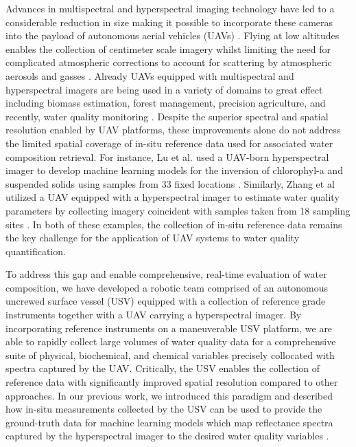 \documentclass[remotesensing,article,submit,pdftex,moreauthors]{Definitions/mdpi}
\begin{document}
Advances in multispectral and hyperspectral imaging technology have led to a considerable reduction in size making it possible to incorporate these cameras into the payload of autonomous aerial vehicles (UAVs) \cite{hruska2012radiometric}. Flying at low altitudes enables the collection of centimeter scale imagery whilst limiting the need for complicated atmospheric corrections to account for scattering by atmospheric aerosols and gasses \cite{adao2017hyperspectral, banerjee2020uav}. Already UAVs equipped with multispectral and hyperspectral imagers are being used in a variety of domains to great effect including biomass estimation, forest management, precision agriculture, and recently, water quality monitoring \cite{adao2017hyperspectral, padua2017uas,arroyo2019implementation,kurihara2020unmanned, ehmann2019monitoring}. Despite the superior spectral and spatial resolution enabled by UAV platforms, these improvements alone do not address the limited spatial coverage of in-situ reference data used for associated water composition retrieval. For instance, Lu et al. used a UAV-born hyperspectral imager to develop machine learning models for the inversion of chlorophyl-a and suspended solids using samples from 33 fixed locations \cite{lu2021retrieval}. Similarly, Zhang et al utilized a UAV equipped with a hyperspectral imager to estimate water quality parameters by collecting imagery coincident with samples taken from 18 sampling sites \cite{zhang2022selection}. In both of these examples, the collection of in-situ reference data remains the key challenge for the application of UAV systems to water quality quantification.

To address this gap and enable comprehensive, real-time evaluation of water composition, we have developed a robotic team comprised of an autonomous uncrewed surface vessel (USV) equipped with a collection of reference grade instruments together with a UAV carrying a hyperspectral imager. By incorporating reference instruments on a maneuverable USV platform, we are able to rapidly collect large volumes of water quality data for a comprehensive suite of physical, biochemical, and chemical variables precisely collocated with spectra captured by the UAV. Critically, the USV enables the collection of reference data with significantly improved spatial resolution compared to other approaches. In our previous work, we introduced this paradigm and described how in-situ measurements collected by the USV can be used to provide the ground-truth data for machine learning models which map reflectance spectra captured by the hyperspectral imager to the desired water quality variables \cite{robotTeam1}.
\end{document}
